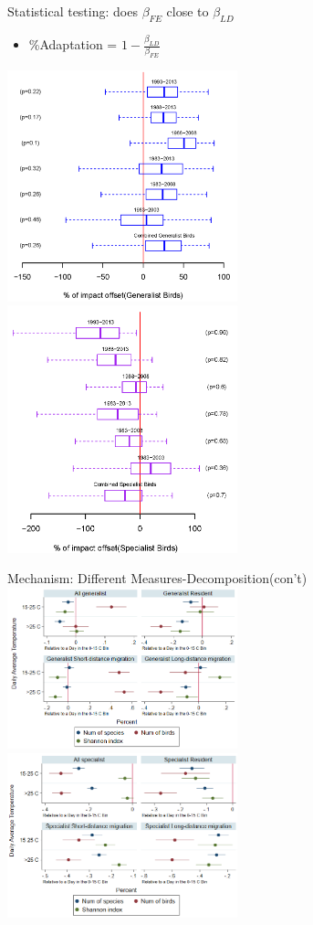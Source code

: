 \documentclass{beamer}
\begin{document}
\begin{frame}{Statistical testing: does $\beta_{FE}$ close to $\beta_{LD}$}
  \begin{itemize}
    \item \%Adaptation = $1-\frac{\beta_{LD}}{\beta_{FE}}$
  \end{itemize}
\includegraphics[width=0.5\textwidth]{long_diff1.png}%
\includegraphics[width=0.5\textwidth]{long_diff2.png}
\end{frame}



\begin{frame}{Mechanism: Different Measures-Decomposition(con't)}
  \includegraphics[width=0.5\textwidth]{bird_figure2b}%
  \includegraphics[width=0.5\textwidth]{bird_figure2c}
\end{frame}
\end{document}
